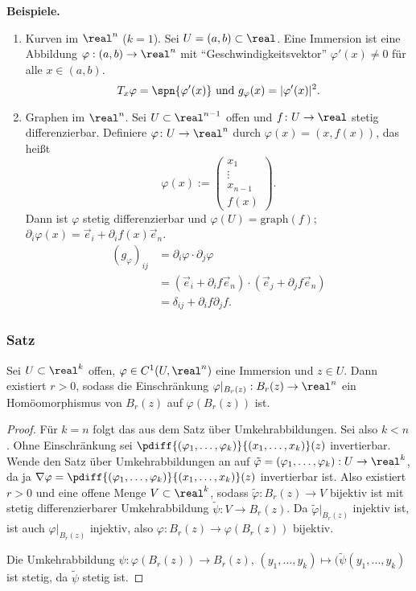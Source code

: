 \documentclass[
 a4paper,
 12pt,
 parskip=half
 ]{scrartcl}
\theoremstyle{plain}
\theoremstyle{definition}
\numberwithin{equation}{section}
\begin{document}
\textbf{Beispiele.}
\begin{enumerate}
 \item Kurven im $\real^n$ ($k=1$). Sei $U = (a,b) \subset \real$. Eine Immersion ist eine Abbildung $\varphi:(a,b) \to \real^n$ mit ``Geschwindigkeitsvektor'' $\varphi'(x) \ne 0$ für alle $x \in (a,b)$.
 \[ T_x \varphi = \spn\{ \varphi'(x)\} \text{ und } g_\varphi(x) = | \varphi'(x) |^2. \]
 \item Graphen im $\real^n$. Sei $U \subset \real^{n-1}$ offen und $f\colon U \to \real$ stetig differenzierbar. Definiere $\varphi\colon U \to \real^n$ durch $\varphi(x) = (x, f(x))$, das heißt 
 \[ \varphi(x) := \begin{pmatrix} x_1 \\ \vdots \\ x_{n-1} \\ f(x) \end{pmatrix}. \]
 Dann ist $\varphi$ stetig differenzierbar und $\varphi(U) =  \mathrm{graph}(f)$; $\partial_i \varphi(x) = \vec{e}_i + \partial_i f(x) \vec{e}_n$.
 \[ \begin{aligned}
     (g_\varphi)_{ij} &= \partial_i \varphi \cdot \partial_j \varphi \\
     &= (\vec{e}_i + \partial_i f \vec{e}_n) \cdot (\vec{e}_j + \partial_j f \vec{e}_n) \\
     &= \delta_{ij} + \partial_i f \partial_j f.
    \end{aligned} \]
\end{enumerate}

\subsubsection{Satz}
\begin{thm}
 Sei $U \subset \real^k$ offen, $\varphi \in C^1(U, \real^n)$ eine Immersion und $z \in U$. Dann existiert $r > 0$, sodass die Einschränkung $\varphi|_{B_r(z)} : B_r(z) \to \real^n$ ein Homöomorphismus von $B_r(z)$ auf $\varphi(B_r(z))$ ist.
\end{thm}

\begin{proof}
 Für $k = n$ folgt das aus dem Satz über Umkehrabbildungen. Sei also $k < n$. Ohne Einschränkung sei $\pdiff{(\varphi_{1}, \ldots, \varphi_{k})}{(x_1, \ldots, x_k)}(z)$ invertierbar. Wende den Satz über Umkehrabbildungen an auf $\tilde{\varphi} = ( \varphi_1, \ldots, \varphi_k): U \to \real^k$, da ja $\nabla \varphi = \pdiff{(\varphi_{1}, \ldots, \varphi_{k})}{(x_1, \ldots, x_k)}(z)$ invertierbar ist. Also existiert $r > 0$ und eine offene Menge $V \subset \real^k$, sodass $\tilde{\varphi}: B_r(z) \to V$ bijektiv ist mit stetig differenzierbarer Umkehrabbildung $\tilde{\psi}: V \to B_r(z)$. Da $\tilde{\varphi}|_{B_r(z)}$ injektiv ist, ist auch $\varphi|_{B_r(z)}$ injektiv, also $\varphi:B_r(z) \to \varphi(B_r(z))$ bijektiv.
 
 Die Umkehrabbildung $\psi : \varphi(B_r(z)) \to B_r(z)$, $(y_1, \ldots, y_k) \mapsto (\tilde{\psi}(y_1, \ldots, y_k)$ ist stetig, da $\tilde{\psi}$ stetig ist.
\end{proof}
\end{document}
